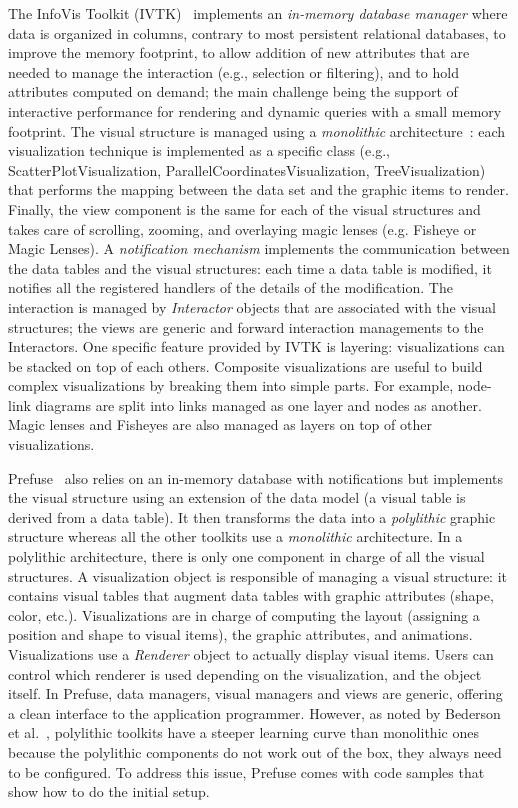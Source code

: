 The InfoVis Toolkit (IVTK)~\cite{InfoVis} implements an
\emph{in-memory database manager} where data is organized in columns,
contrary to most persistent relational databases, to improve the
memory footprint, to allow addition of new attributes that are needed
to manage the interaction (e.g., selection or filtering), and to hold
attributes computed on demand; the main challenge being the support of
interactive performance for rendering and dynamic queries with a small
memory footprint.  The visual structure is managed using a
\emph{monolithic} architecture~\cite{Polylithic}: each visualization
technique is implemented as a specific class (e.g.,
ScatterPlotVisualization, ParallelCoordinatesVisualization,
TreeVisualization) that performs the mapping between the data set and
the graphic items to render.  Finally, the view component is the same
for each of the visual structures and takes care of scrolling,
zooming, and overlaying magic lenses (e.g. Fisheye or Magic Lenses).
A \emph{notification mechanism} implements the communication between
the data tables and the visual structures: each time a data table is
modified, it notifies all the registered handlers of the details of
the modification. The interaction is managed by \emph{Interactor}
objects that are associated with the visual structures; the views are
generic and forward interaction managements to the Interactors.  One
specific feature provided by IVTK is layering: visualizations can be
stacked on top of each others.  Composite visualizations are useful
to build complex visualizations by breaking them into simple
parts. For example, node-link diagrams are split into links managed as
one layer and nodes as another.  Magic lenses and Fisheyes are also
managed as layers on top of other visualizations.

Prefuse~\cite{Prefuse} also relies on an in-memory database with
notifications but implements the visual structure using an extension of
the data model (a visual table is derived from a data table).  It then
transforms the data into a \emph{polylithic} graphic structure whereas
all the other toolkits use a \emph{monolithic} architecture.  In a
polylithic architecture, there is only one component in charge of all
the visual structures.  A visualization object is responsible of
managing a visual structure: it contains visual tables that augment
data tables with graphic attributes (shape, color, etc.).
Visualizations are in charge of computing the layout (assigning a
position and shape to visual items), the graphic attributes, and
animations.  Visualizations use a \emph{Renderer} object to actually
display visual items.  Users can control which renderer is used
depending on the visualization, and the object itself.  In Prefuse,
data managers, visual managers and views are generic, offering a
clean interface to the application programmer.  However, as noted by
Bederson et al.~\cite{Polylithic}, polylithic toolkits have a steeper
learning curve than monolithic ones because the polylithic components
do not work out of the box, they always need to be configured.  To
address this issue, Prefuse comes with code samples that show how to
do the initial setup.


